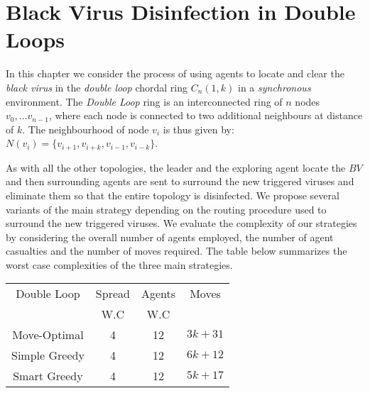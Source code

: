 


\chapter {Black Virus Disinfection in Double Loops}
\label{DL}
 


In this chapter we consider the process of using agents to locate and clear the {\it black virus}  in the {\it double loop} chordal ring $C_n(1,k)$  in a {\it synchronous} environment.  
The {\it Double Loop} ring is an interconnected ring of $n$ nodes $v_0, \ldots v_{n-1}$, where each node is connected to two additional neighbours at distance of $k$. 
The neighbourhood of node $v_i$ is thus given by: $N(v_{i})=\{v_{i+1},v_{i+k},v_{i-1},v_{i-k}\}$.



 As with all the other topologies,  the leader and the exploring agent locate the  $BV$ and then surrounding agents are sent to surround the new triggered viruses  and  eliminate them so  that  the entire topology is disinfected.
We propose several variants of the main strategy depending on the routing procedure used to surround the new triggered viruses.
We evaluate the complexity of our  strategies
 by considering the  overall number of agents employed, the number of agent casualties and the number of moves required. The table below summarizes the worst case  complexities of the three main strategies.

 

 
\begin{center}
  \begin{tabular}{|c|c|c|c|}
 \hline
   Double Loop      & Spread & Agents & Moves    \\
 &W.C&W.C& \\
 \hline
 Move-Optimal   &  4  & 12 & $3k+31$  \\ %
 \hline
 Simple Greedy   &  4 &  12   &   $6k+12$\\
 \hline
 Smart Greedy   &  4  & 12 &   $5k+17$ \\
 \hline
 \end{tabular}
 \end{center}
 









